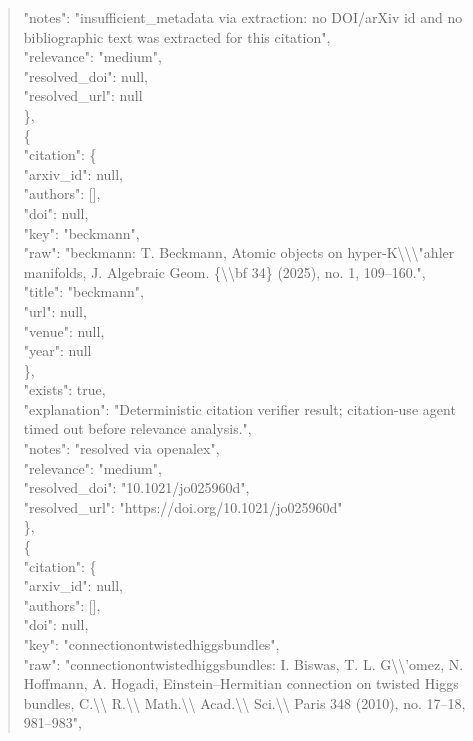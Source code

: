 \documentclass[11pt]{article}
\begin{document}
\begin{quote}
      "notes": "insufficient\_metadata via extraction: no DOI/arXiv id and no bibliographic text was extracted for this citation",\\
      "relevance": "medium",\\
      "resolved\_doi": null,\\
      "resolved\_url": null\\
    \},\\
    \{\\
      "citation": \{\\
        "arxiv\_id": null,\\
        "authors": [],\\
        "doi": null,\\
        "key": "beckmann",\\
        "raw": "beckmann: T. Beckmann, Atomic objects on hyper-K\textbackslash{}\textbackslash{}\textbackslash{}"ahler manifolds, J. Algebraic Geom. \{\textbackslash{}\textbackslash{}bf 34\} (2025), no. 1, 109--160.",\\
        "title": "beckmann",\\
        "url": null,\\
        "venue": null,\\
        "year": null\\
      \},\\
      "exists": true,\\
      "explanation": "Deterministic citation verifier result; citation-use agent timed out before relevance analysis.",\\
      "notes": "resolved via openalex",\\
      "relevance": "medium",\\
      "resolved\_doi": "10.1021/jo025960d",\\
      "resolved\_url": "https://doi.org/10.1021/jo025960d"\\
    \},\\
    \{\\
      "citation": \{\\
        "arxiv\_id": null,\\
        "authors": [],\\
        "doi": null,\\
        "key": "connectionontwistedhiggsbundles",\\
        "raw": "connectionontwistedhiggsbundles: I. Biswas, T. L. G\textbackslash{}\textbackslash{}'omez, N. Hoffmann, A. Hogadi, Einstein--Hermitian connection on twisted Higgs bundles, C.\textbackslash{}\textbackslash{} R.\textbackslash{}\textbackslash{} Math.\textbackslash{}\textbackslash{} Acad.\textbackslash{}\textbackslash{} Sci.\textbackslash{}\textbackslash{} Paris 348 (2010), no. 17--18, 981--983",\\

\end{quote}
\end{document}

